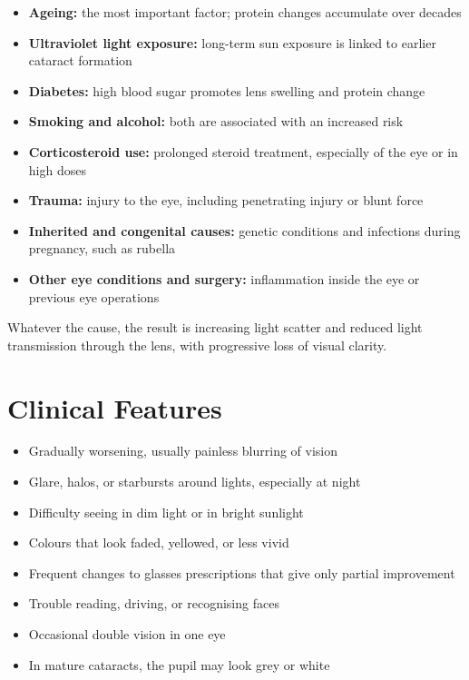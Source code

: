 \begin{itemize}
    \item \textbf{Ageing:} the most important factor; protein changes accumulate over decades
    \item \textbf{Ultraviolet light exposure:} long-term sun exposure is linked to earlier cataract formation
    \item \textbf{Diabetes:} high blood sugar promotes lens swelling and protein change
    \item \textbf{Smoking and alcohol:} both are associated with an increased risk
    \item \textbf{Corticosteroid use:} prolonged steroid treatment, especially of the eye or in high doses
    \item \textbf{Trauma:} injury to the eye, including penetrating injury or blunt force
    \item \textbf{Inherited and congenital causes:} genetic conditions and infections during pregnancy, such as rubella
    \item \textbf{Other eye conditions and surgery:} inflammation inside the eye or previous eye operations
\end{itemize}

Whatever the cause, the result is increasing light scatter and reduced light transmission through the lens, with progressive loss of visual clarity.

\section*{Clinical Features}
\begin{itemize}
    \item Gradually worsening, usually painless blurring of vision
    \item Glare, halos, or starbursts around lights, especially at night
    \item Difficulty seeing in dim light or in bright sunlight
    \item Colours that look faded, yellowed, or less vivid
    \item Frequent changes to glasses prescriptions that give only partial improvement
    \item Trouble reading, driving, or recognising faces
    \item Occasional double vision in one eye
    \item In mature cataracts, the pupil may look grey or white
\end{itemize}

